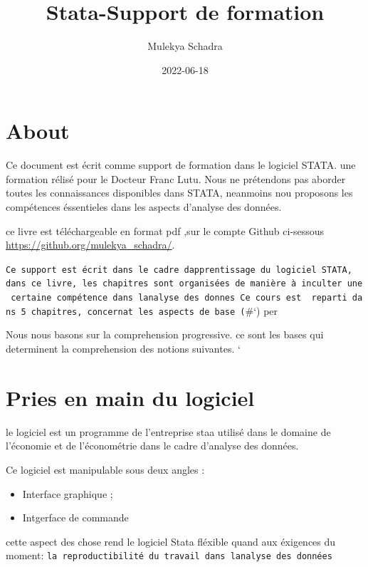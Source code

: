 \documentclass[
]{book}
\title{Stata-Support de formation}
\author{Mulekya Schadra}
\date{2022-06-18}
\providecommand{\tightlist}{%
  \setlength{\itemsep}{0pt}\setlength{\parskip}{0pt}}
\theoremstyle{definition}
\theoremstyle{definition}
\theoremstyle{definition}
\theoremstyle{definition}
\theoremstyle{remark}
\begin{document}
\maketitle

{
\setcounter{tocdepth}{1}
\tableofcontents
}
\hypertarget{about}{%
\chapter{About}\label{about}}

Ce document est écrit comme support de formation dans le logiciel STATA. une formation rélisé pour le Docteur Franc Lutu.
Nous ne prétendons pas aborder toutes les connaissances disponibles dans STATA,
neanmoins nou proposons les compétences éssentieles dans les aspects d'analyse des données.

ce livre est téléchargeable en format pdf ,sur le compte Github ci-sessous \url{https://github.org/mulekya_schadra/}.

\texttt{Ce\ support\ est\ écrit\ dans\ le\ cadre\ d\textquotesingle{}apprentissage\ du\ logiciel\ STATA,\ \ dans\ ce\ livre,\ les\ chapitres\ sont\ organisées\ de\ manière\ à\ inculter\ une\ certaine\ compétence\ dans\ l\textquotesingle{}analyse\ des\ donnes\ Ce\ cours\ est\ \ reparti\ dans\ 5\ chapitres,\ concernat\ les\ aspects\ de\ base\ (}\#`) per

Nous nous basons sur la comprehension progressive. ce sont les bases qui determinent la comprehension des notions suivantes. `

\hypertarget{pries-en-main-du-logiciel}{%
\chapter{Pries en main du logiciel}\label{pries-en-main-du-logiciel}}

le logiciel est un programme de l'entreprise staa utilisé dans le domaine de l'économie et de l'économétrie dans le cadre d'analyse des données.

Ce logiciel est manipulable sous deux angles :

\begin{itemize}
\tightlist
\item
  Interface graphique ;
\item
  Intgerface de commande
\end{itemize}

cette aspect des chose rend le logiciel Stata fléxible quand aux éxigences du moment: \texttt{la\ reproductibilité\ du\ travail\ dans\ l\textquotesingle{}analyse\ des\ données}
\end{document}
